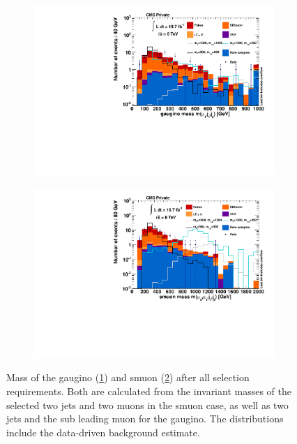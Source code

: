\begin{figure}[htb!]
  \centering
  \begin{subfigure}[b]{0.7\textwidth}
    \centering
    \includegraphics[width=\textwidth]{plots/m_gaugino.pdf}
    \caption{\label{fig:m_gaugino}}
  \end{subfigure}
  \begin{subfigure}[b]{0.7\textwidth}
    \centering
    \includegraphics[width=\textwidth]{plots/m_smuon.pdf}
    \caption{\label{fig:m_smuon}}
  \end{subfigure}
  \caption{Mass of the gaugino (\ref{fig:m_gaugino}) and smuon (\ref{fig:m_smuon}) after all selection requirements. Both are calculated from the invariant masses of the selected two jets and two muons in the smuon case, as well as two jets and the sub leading muon for the gaugino. The distributions include the data-driven background estimate.}
  \label{fig:final-dist}
\end{figure}


